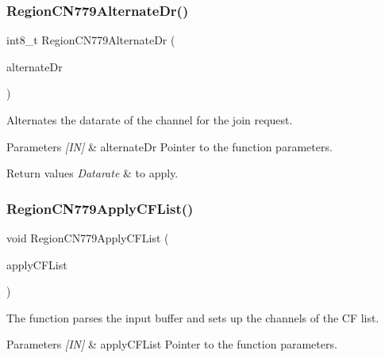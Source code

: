 \subsubsection{\texorpdfstring{Region\+C\+N779\+Alternate\+Dr()}{RegionCN779AlternateDr()}}
{\footnotesize\ttfamily int8\+\_\+t Region\+C\+N779\+Alternate\+Dr (\begin{DoxyParamCaption}\item[{\hyperlink{group__REGION_ga001ea4338d1c83f4c785b49d7ad2d696}{Alternate\+Dr\+Params\+\_\+t} $\ast$}]{alternate\+Dr }\end{DoxyParamCaption})}



Alternates the datarate of the channel for the join request. 


\begin{DoxyParams}{Parameters}
{\em \mbox{[}\+I\+N\mbox{]}} & alternate\+Dr Pointer to the function parameters.\\
\hline
\end{DoxyParams}

\begin{DoxyRetVals}{Return values}
{\em Datarate} & to apply. \\
\hline
\end{DoxyRetVals}
\mbox{\label{group__REGIONCN779_ga7f02e6a802649d9b93c4c56eff271a26}} 
\subsubsection{\texorpdfstring{Region\+C\+N779\+Apply\+C\+F\+List()}{RegionCN779ApplyCFList()}}
{\footnotesize\ttfamily void Region\+C\+N779\+Apply\+C\+F\+List (\begin{DoxyParamCaption}\item[{\hyperlink{group__REGION_ga71588e9ad07e34b78fa91d51881fd3c6}{Apply\+C\+F\+List\+Params\+\_\+t} $\ast$}]{apply\+C\+F\+List }\end{DoxyParamCaption})}



The function parses the input buffer and sets up the channels of the CF list. 


\begin{DoxyParams}{Parameters}
{\em \mbox{[}\+I\+N\mbox{]}} & apply\+C\+F\+List Pointer to the function parameters. \\
\hline
\end{DoxyParams}
\mbox{\label{group__REGIONCN779_gab03fbee2e88e81b71c04f907af8b283e}} 
